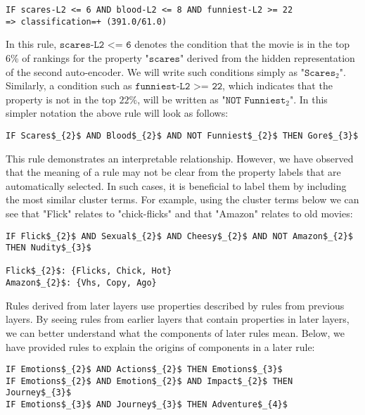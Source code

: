 \begin{lstlisting}[mathescape=true]
IF scares-L2 <= 6 AND blood-L2 <= 8 AND funniest-L2 >= 22
=> classification=+ (391.0/61.0)
\end{lstlisting}

\noindent In this rule, $\texttt{scares-L2 <= 6}$ denotes the condition that the movie is in the top 6\% of rankings for the property "$\texttt{scares}$" derived from the hidden representation of the second auto-encoder. We will write such conditions simply as "$\texttt{Scares$_{2}$}$". Similarly, a condition such as $\texttt{funniest-L2 >= 22}$, which indicates that the property is not in the top $22\%$, will be written as "$\texttt{NOT Funniest}$$_{2}$". In this simpler notation the above rule will look as follows: %

\begin{lstlisting}[mathescape=true]
IF Scares$_{2}$ AND Blood$_{2}$ AND NOT Funniest$_{2}$ THEN Gore$_{3}$
\end{lstlisting}

This rule demonstrates an interpretable relationship. However, we have observed that the meaning of a rule may not be clear from the property labels that are automatically selected. In such cases, it is beneficial to label them by including the most similar cluster terms. For example, using the cluster terms below we can see that "Flick" relates to "chick-flicks" and that "Amazon" relates to old movies:

\begin{lstlisting}[mathescape=true]
IF Flick$_{2}$ AND Sexual$_{2}$ AND Cheesy$_{2}$ AND NOT Amazon$_{2}$ THEN Nudity$_{3}$

Flick$_{2}$: {Flicks, Chick, Hot}
Amazon$_{2}$: {Vhs, Copy, Ago}
\end{lstlisting}

Rules derived from later layers use properties described by rules from previous layers. By seeing rules from earlier layers that contain properties in later layers, we can better understand what the components of later rules mean. Below, we have provided rules to explain the origins of components in a later rule:

\begin{lstlisting}[mathescape=true]
IF Emotions$_{2}$ AND Actions$_{2}$ THEN Emotions$_{3}$ 
IF Emotions$_{2}$ AND Emotion$_{2}$ AND Impact$_{2}$ THEN Journey$_{3}$ 
IF Emotions$_{3}$ AND Journey$_{3}$ THEN Adventure$_{4}$ 
\end{lstlisting}

